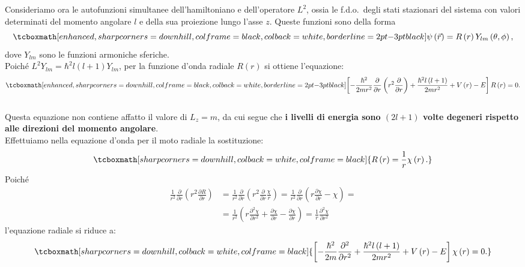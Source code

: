 \documentclass[a4paper,12pt,oneside]{book}
\begin{document}
Consideriamo ora le autofunzioni simultanee dell'hamiltoniano e dell'operatore $L^2$, ossia le f.d.o.~degli stati stazionari del sistema con valori determinati del momento angolare $l$ e della sua proiezione lungo l'asse $z$. Queste funzioni sono della forma
	\begin{equation}
		\tcboxmath[enhanced, sharp corners=downhill, colframe=black, colback=white, borderline={2pt}{-3pt}{black}]{
			\psi\left(\vec{r}\right)=R\left(r\right)Y_{lm}\left(\theta,\phi\right) ,
			}
	\end{equation}
dove $Y_{lm}$ sono le funzioni armoniche sferiche.\\

Poiché $L^2Y_{lm}=\hbar^2l\left(l+1\right)Y_{lm}$, per la funzione d'onda radiale $R\left(r\right)$ si ottiene l'equazione:
	\begin{equation}
		\tcboxmath[enhanced, sharp corners=downhill, colframe=black, colback=white, borderline={2pt}{-3pt}{black}]{
			\left[-\frac{\hbar^2}{2mr^2}\frac{\partial}{\partial r}\left(r^2\frac{\partial}{\partial r}\right)+\frac{\hbar^2l\left(l+1\right)}{2mr^2}+V\left(r\right)-E\right]R\left(r\right)=0 .
			}
	\end{equation}\\
	
Questa equazione non contiene affatto il valore di $L_z=m$, da cui segue che \textbf{i livelli di energia sono $\left(2l+1\right)$ volte degeneri rispetto alle direzioni del momento angolare}.\\

Effettuiamo nella equazione d'onda per il moto radiale la sostituzione:
	\begin{equation}
		\tcboxmath[sharp corners=downhill, colback=white, colframe=black]{
			R\left(r\right)=\frac{1}{r}\chi\left(r\right) .
			}
	\end{equation}
Poiché
	\begin{align}
		\frac{1}{r^2}\frac{\partial}{\partial r}\left(r^2\frac{\partial R}{\partial r}\right)&=\frac{1}{r^2}\frac{\partial}{\partial r}\left(r^2\frac{\partial}{\partial r}\frac{\chi}{r}\right)=\frac{1}{r^2}\frac{\partial}{\partial r}\left(r \frac{\partial\chi}{\partial r}-\chi\right)= \nonumber \\
		&= \frac{1}{r^2}\left(r\frac{\partial^2\chi}{\partial r^2}+\frac{\partial\chi}{\partial r}-\frac{\partial\chi}{\partial r}\right) = \frac{1}{r}\frac{\partial^2 \chi}{\partial r^2}
\end{align}
l'equazione radiale si riduce a:
	\begin{equation}
		\tcboxmath[sharp corners=downhill, colback=white, colframe=black]{
			\left[-\frac{\hbar^2}{2m}\frac{\partial^2}{\partial r^2}+\frac{\hbar^2l\left(l+1\right)}{2mr^2}+V\left(r\right)-E\right]\chi\left(r\right)=0 .
			}
	\end{equation}\\
\end{document}
